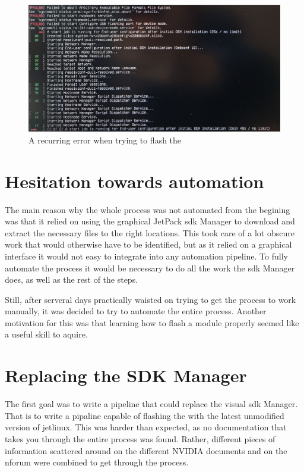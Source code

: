 \begin{figure}[H]
    \centering
    \includegraphics[width=1\textwidth]{figures/stuck_in_boot_loop.jpg}
    \caption{A recurring error when trying to flash the \jx}
    \label{fig:stuck_in_boot_loop}
\end{figure}

\section{Hesitation towards automation}
The main reason why the whole process was not automated from the begining was that it relied on using the graphical JetPack \gls{sdk} Manager to download and extract the necessary files to the right locations.
This took care of a lot obscure work that would otherwise have to be identified, but as it relied on a graphical interface it would not easy to integrate into any automation pipeline.
To fully automate the process it would be necessary to do all the work the \gls{sdk} Manager does, as well as the rest of the steps.

Still, after serveral days practically waisted on trying to get the process to work manually, it was decided to try to automate the entire process.
Another motivation for this was that learning how to flash a \jetson module properly seemed like a useful skill to aquire.

\section{Replacing the SDK Manager}
The first goal was to write a pipeline that could replace the visual \gls{sdk} Manager.
That is to write a pipaline capable of flashing the \jx with the latest unmodified version of \gls{jetlinux}.
This was harder than expected, as no documentation that takes you through the entire process was found.
Rather, different pieces of information scattered around on the different NVIDIA documents and on the \gls{nforum} were combined to get through the process.


